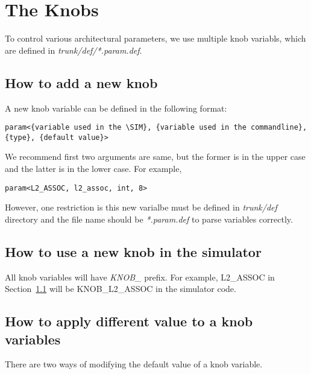 
\clearpage
\section{The Knobs}
\label{sec:knob}

To control various architectural parameters, we use multiple knob
variabls, which are defined in \textit{trunk/def/*.param.def}.

\subsection{How to add a new knob}
\label{sec:knob1}

A new knob variable can be defined in the following format:

\smallskip
\begin{lstlisting}
param<{variable used in the \SIM}, {variable used in the commandline}, {type}, {default value}>
\end{lstlisting}
\smallskip

We recommend first two arguments are same, but the former is in the
upper case and the latter is in the lower case. For example,

\smallskip
\begin{lstlisting}
param<L2_ASSOC, l2_assoc, int, 8>
\end{lstlisting}
\smallskip


However, one restriction is this new varialbe must be defined
in \textit{trunk/def} directory and the file name should
be \textit{*.param.def} to parse variables correctly.


\subsection{How to use a new knob in the simulator}

All knob variables will have \textit{KNOB\_} prefix. For example,
L2\_ASSOC in Section~\ref{sec:knob1} will be KNOB\_L2\_ASSOC in the
simulator code.


\subsection{How to apply different value to a knob variables}

There are two ways of modifying the default value of a knob variable.

